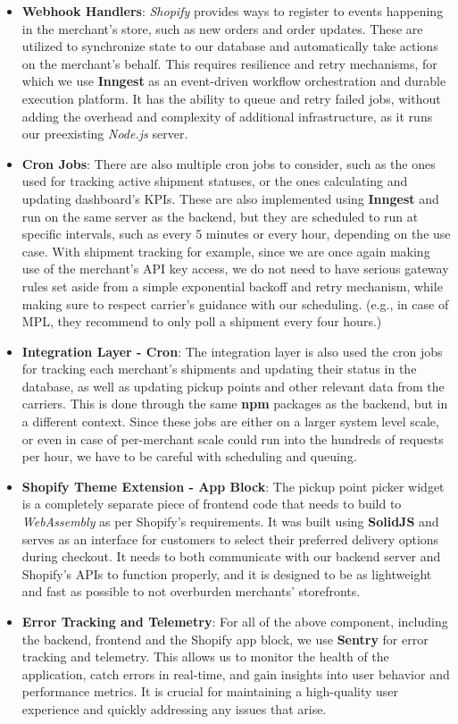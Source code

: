 \documentclass{imc-inf}
\begin{document}
\begin{itemize}[itemsep=3pt]
  \item \textbf{Webhook Handlers}: \textit{Shopify} provides ways to register to events happening in the merchant's store, such as new orders and order updates. These are utilized to synchronize state to our database and automatically take actions on the merchant's behalf. This requires resilience and retry mechanisms, for which we use \textbf{Inngest} as an event-driven workflow orchestration and durable execution platform. It has the ability to queue and retry failed jobs, without adding the overhead and complexity of additional infrastructure, as it runs our preexisting \textit{Node.js} server.
  \item \textbf{Cron Jobs}: There are also multiple cron jobs to consider, such as the ones used for tracking active shipment statuses, or the ones calculating and updating dashboard's KPIs. These are also implemented using \textbf{Inngest} and run on the same server as the backend, but they are scheduled to run at specific intervals, such as every 5 minutes or every hour, depending on the use case. With shipment tracking for example, since we are once again making use of the merchant's API key access, we do not need to have serious gateway rules set aside from a simple exponential backoff and retry mechanism, while making sure to respect carrier's guidance with our scheduling. (e.g., in case of MPL, they recommend to only poll a shipment every four hours.)
  \item \textbf{Integration Layer - Cron}: The integration layer is also used the cron jobs for tracking each merchant's shipments and updating their status in the database, as well as updating pickup points and other relevant data from the carriers. This is done through the same \textbf{npm} packages as the backend, but in a different context. Since these jobs are either on a larger system level scale, or even in case of per-merchant scale could run into the hundreds of requests per hour, we have to be careful with scheduling and queuing.
  \item \textbf{Shopify Theme Extension - App Block}: The pickup point picker widget is a completely separate piece of frontend code that needs to build to \textit{WebAssembly} as per Shopify's requirements. It was built using \textbf{SolidJS} and serves as an interface for customers to select their preferred delivery options during checkout. It needs to both communicate with our backend server and Shopify's APIs to function properly, and it is designed to be as lightweight and fast as possible to not overburden merchants' storefronts.
  \item \textbf{Error Tracking and Telemetry}: For all of the above component, including the backend, frontend and the Shopify app block, we use \textbf{Sentry} for error tracking and telemetry. This allows us to monitor the health of the application, catch errors in real-time, and gain insights into user behavior and performance metrics. It is crucial for maintaining a high-quality user experience and quickly addressing any issues that arise.
\end{itemize}
\end{document}
